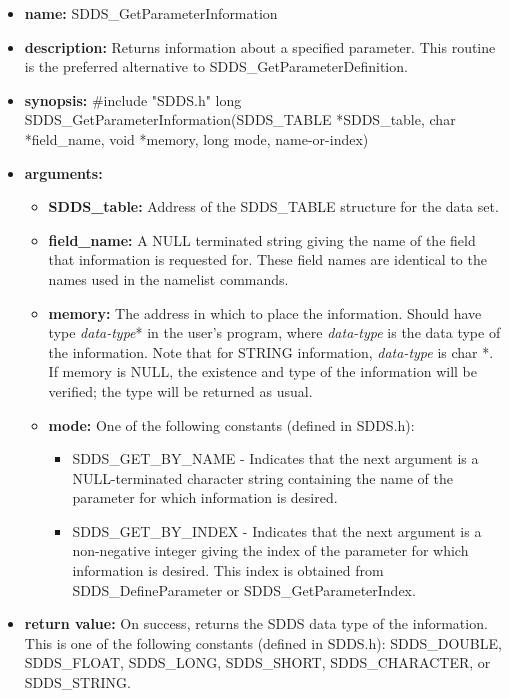 \documentclass[11pt]{article}
\begin{document}
\begin{itemize}
\item {\bf name:}\newline
SDDS\_GetParameterInformation
\item {\bf description:}\newline
Returns information about a specified parameter. This routine is the preferred alternative to SDDS\_GetParameterDefinition.
\item {\bf synopsis:} \#include "SDDS.h"\newline
long SDDS\_GetParameterInformation(SDDS\_TABLE *SDDS\_table, char *field\_name, void *memory, long mode,  name-or-index)
\item {\bf arguments:}
\begin{itemize}
\item {\bf SDDS\_table:} Address of the SDDS\_TABLE structure for the data set.
\item {\bf field\_name:} A NULL terminated string giving the name of the field that information is requested for. These field names are identical to the names used in the namelist commands.
\item {\bf memory:} The address in which to place the information. Should have type {\em data-type}* in the user's program, where {\em data-type} is the data type of the information. Note that for STRING information, {\em data-type} is char *. If memory is NULL, the existence and type of the information will be verified; the type will be returned as usual.
\item {\bf mode:} One of the following constants (defined in SDDS.h):
\begin{itemize}
\item SDDS\_GET\_BY\_NAME -  Indicates that the next argument is a NULL-terminated character string containing the name of the parameter for which information is desired.
\item SDDS\_GET\_BY\_INDEX - Indicates that the next argument is a non-negative integer giving the index of the parameter for which information is desired. This index is obtained from SDDS\_DefineParameter or SDDS\_GetParameterIndex.
\end{itemize}
\end{itemize}
\item {\bf return value:}\newline
On success, returns the SDDS data type of the information. This is one of the following constants (defined in SDDS.h): SDDS\_DOUBLE, SDDS\_FLOAT, SDDS\_LONG, SDDS\_SHORT, SDDS\_CHARACTER, or SDDS\_STRING.\newline

\end{itemize}
\end{document}
